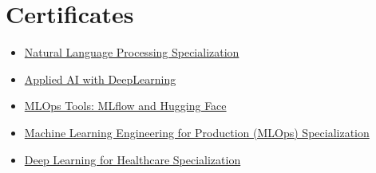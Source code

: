 \documentclass[11pt,letter,sans]{moderncv} %
\newcommand*{\authorimg}[1]{%
	\raisebox{-.25\baselineskip}{%
		\texttt{[image: \#1]}%
	}%
}
\begin{document}
\section{Certificates}
    \begin{multicols}{2}
        \begin{itemize}
            \item \authorimg{Images/nlp.png} \href{https://www.coursera.org/specializations/natural-language-processing}{Natural Language Processing Specialization}

            \item \authorimg{Images/ai.png}          \href{https://www.coursera.org/learn/ai}{Applied AI with DeepLearning}

            \item \authorimg{Images/hf-logo.png}          \href{https://www.coursera.org/learn/mlops-mlflow-huggingface-duke}{MLOps Tools: MLflow and Hugging Face}
            
            \item \authorimg{Images/MLOps.png} \href{https://www.coursera.org/specializations/machine-learning-engineering-for-production-mlops}{Machine Learning Engineering for Production (MLOps) Specialization}
            
            \item \authorimg{Images/AIMedical.png}
            \href{https://www.coursera.org/specializations/deep-learning-healthcare}{Deep Learning for Healthcare Specialization}
            
        
        
        
            

\end{itemize}
\end{multicols}
\end{document}
